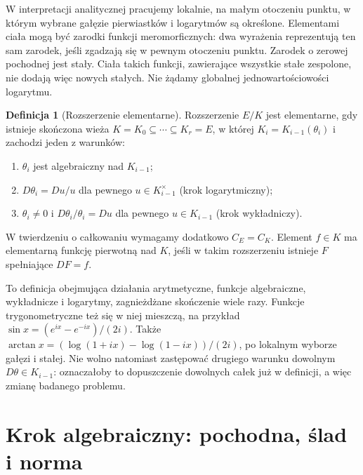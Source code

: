 \documentclass[11pt,a4paper,oneside]{book}
\numberwithin{equation}{section}
\theoremstyle{plain}
\theoremstyle{definition}
\newtheorem{definicja}[twierdzenie]{Definicja}
\theoremstyle{remark}
\begin{document}
W interpretacji analitycznej pracujemy lokalnie, na małym otoczeniu punktu, w którym wybrane gałęzie pierwiastków i logarytmów są określone. Elementami ciała mogą być zarodki funkcji meromorficznych: dwa wyrażenia reprezentują ten sam zarodek, jeśli zgadzają się w pewnym otoczeniu punktu. Zarodek o zerowej pochodnej jest stały. Ciała takich funkcji, zawierające wszystkie stałe zespolone, nie dodają więc nowych stałych. Nie żądamy globalnej jednowartościowości logarytmu.

\begin{definicja}[Rozszerzenie elementarne]
Rozszerzenie $E/K$ jest elementarne, gdy istnieje skończona wieża $K=K_0\subseteq\cdots\subseteq K_r=E$, w której $K_i=K_{i-1}(\theta_i)$ i zachodzi jeden z warunków:
\begin{enumerate}
\item $\theta_i$ jest algebraiczny nad $K_{i-1}$;
\item $D\theta_i=Du/u$ dla pewnego $u\in K_{i-1}^\times$ (krok logarytmiczny);
\item $\theta_i\ne0$ i $D\theta_i/\theta_i=Du$ dla pewnego $u\in K_{i-1}$ (krok wykładniczy).
\end{enumerate}
W twierdzeniu o całkowaniu wymagamy dodatkowo $C_E=C_K$. Element $f\in K$ ma elementarną funkcję pierwotną nad $K$, jeśli w takim rozszerzeniu istnieje $F$ spełniające $DF=f$.
\end{definicja}

To definicja obejmująca działania arytmetyczne, funkcje algebraiczne, wykładnicze i logarytmy, zagnieżdżane skończenie wiele razy. Funkcje trygonometryczne też się w niej mieszczą, na przykład $\sin x=(e^{ix}-e^{-ix})/(2i)$. Także $\arctan x=(\log(1+ix)-\log(1-ix))/(2i)$, po lokalnym wyborze gałęzi i stałej. Nie wolno natomiast zastępować drugiego warunku dowolnym $D\theta\in K_{i-1}$: oznaczałoby to dopuszczenie dowolnych całek już w definicji, a więc zmianę badanego problemu.

\section{Krok algebraiczny: pochodna, ślad i norma}
\end{document}
